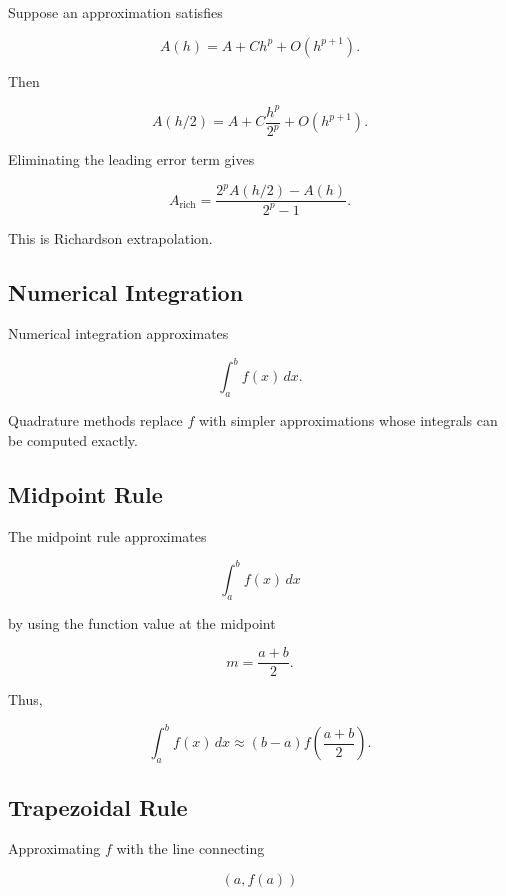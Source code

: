 Suppose an approximation satisfies

\[
A(h)
=
A
+
Ch^p
+
O(h^{p+1}).
\]

Then

\[
A(h/2)
=
A
+
C
\frac{
h^p
}{
2^p
}
+
O(h^{p+1}).
\]

Eliminating the leading error term gives

\[
\boxed{
A_{\mathrm{rich}}
=
\frac{
2^pA(h/2)-A(h)
}{
2^p-1
}.
}
\]

This is Richardson extrapolation.

\subsection{Numerical Integration}
\label{subsec:numerical-integration}

Numerical integration approximates

\[
\boxed{
\int_a^b
f(x)\,dx.
}
\]

Quadrature methods replace \(f\) with simpler approximations whose
integrals can be computed exactly.

\subsection{Midpoint Rule}
\label{subsec:midpoint-rule}

The midpoint rule approximates

\[
\int_a^b
f(x)\,dx
\]

by using the function value at the midpoint

\[
m
=
\frac{a+b}{2}.
\]

Thus,

\[
\boxed{
\int_a^b
f(x)\,dx
\approx
(b-a)
f
\left(
\frac{a+b}{2}
\right).
}
\]

\subsection{Trapezoidal Rule}
\label{subsec:trapezoidal-rule}

Approximating \(f\) with the line connecting

\[
(a,f(a))
\]

